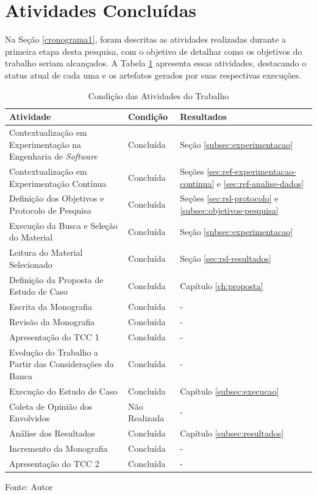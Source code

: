 \section{Atividades Concluídas}

Na Seção \ref{cronograma1}, foram descritas as atividades realizadas durante a primeira etapa desta pesquisa, com o objetivo de detalhar como os objetivos do trabalho seriam alcançados. A Tabela \ref{tab:atividades1} apresenta essas atividades, destacando o status atual de cada uma e os artefatos gerados por suas respectivas execuções.

\begin{table}[ht]
\centering
    \caption{Condição das Atividades do Trabalho}
    \begin{tabular}{|p{8.5cm}|p{3cm}|p{3cm}|}
        \hline
        \textbf{Atividade} & \textbf{Condição} & \textbf{Resultados} \\ \hline
        Contextualização em Experimentação na Engenharia de \textit{Software} & Concluída & Seção \ref{subsec:experimentacao} \\ \hline
        Contextualização em Experimentação Contínua & Concluída & Seções \ref{sec:ref-experimentacao-continua} e \ref{sec:ref-analise-dados} \\ \hline
        Definição dos Objetivos e Protocolo de Pesquisa & Concluída & Seções \ref{sec:rsl-protocolo} e \ref{subsec:objetivos-pesquisa} \\ \hline
        Execução da Busca e Seleção do Material & Concluída & Seção \ref{subsec:experimentacao} \\ \hline
        Leitura do Material Selecionado & Concluída & Seção \ref{sec:rsl-resultados} \\ \hline
        Definição da Proposta de Estudo de Caso & Concluída & Capítulo \ref{ch:proposta} \\ \hline
        Escrita da Monografia & Concluída & - \\ \hline
        Revisão da Monografia & Concluída & - \\ \hline
        Apresentação do TCC 1 & Concluída & - \\ \hline
        Evolução do Trabalho a Partir das Considerações da Banca & Concluída & - \\ \hline
        Execução do Estudo de Caso & Concluída & Capítulo \ref{subsec:execucao} \\ \hline
        Coleta de Opinião dos Envolvidos & Não Realizada & - \\ \hline
        Análise dos Resultados & Concluída & Capítulo \ref{subsec:resultados} \\ \hline
        Incremento da Monografia & Concluída & - \\ \hline
        Apresentação do TCC 2 & Concluída & - \\ \hline
    \end{tabular}

    \label{tab:atividades1}
    
    \begin{center}
        \text Fonte: Autor
    \end{center}
\end{table}
